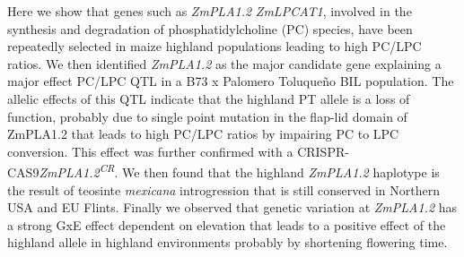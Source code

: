 \documentclass[9pt,twocolumn,twoside]{BioRxiv}
\begin{document}
Here we show that genes such as \textit{ZmPLA1.2} \textit{ZmLPCAT1}, involved in the synthesis and degradation of phosphatidylcholine (PC) species, have been repeatedly selected in maize highland populations leading to high PC/LPC ratios.   
We then identified \textit{ZmPLA1.2} as the major candidate gene explaining a major effect PC/LPC QTL in a B73 x Palomero Toluqueño BIL population. 
The allelic effects of this QTL indicate that the highland PT allele is a loss of function, probably due to single point mutation in the flap-lid domain of ZmPLA1.2 that leads to high PC/LPC ratios by impairing PC to LPC conversion. 
This effect was further confirmed with a CRISPR-CAS9\textit{ZmPLA1.2\textsuperscript{CR}}.
We then found that the highland \textit{ZmPLA1.2} haplotype is the result of teosinte \textit{mexicana} introgression that is still conserved in Northern USA and EU Flints. 
Finally we observed that genetic variation at \textit{ZmPLA1.2} has a strong GxE effect dependent on elevation that leads to a positive effect of the highland allele in highland environments probably by shortening flowering time. 
\end{document}
